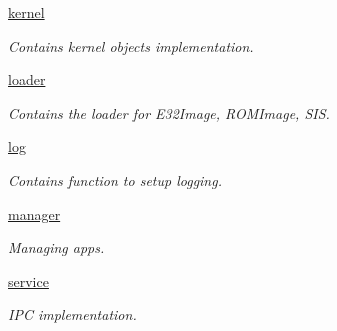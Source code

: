 \begin{DoxyCompactItemize}
 \mbox{\hyperlink{namespaceeka2l1_1_1kernel}{kernel}}
\begin{DoxyCompactList}\small\item\em Contains kernel objects implementation. \end{DoxyCompactList}\item 
 \mbox{\hyperlink{namespaceeka2l1_1_1loader}{loader}}
\begin{DoxyCompactList}\small\item\em Contains the loader for E32\+Image, R\+O\+M\+Image, S\+IS. \end{DoxyCompactList}\item 
 \mbox{\hyperlink{namespaceeka2l1_1_1log}{log}}
\begin{DoxyCompactList}\small\item\em Contains function to setup logging. \end{DoxyCompactList}\item 
 \mbox{\hyperlink{namespaceeka2l1_1_1manager}{manager}}
\begin{DoxyCompactList}\small\item\em Managing apps. \end{DoxyCompactList}\item 
 \mbox{\hyperlink{namespaceeka2l1_1_1service}{service}}
\begin{DoxyCompactList}\small\item\em I\+PC implementation. \end{DoxyCompactList}\end{DoxyCompactItemize}
